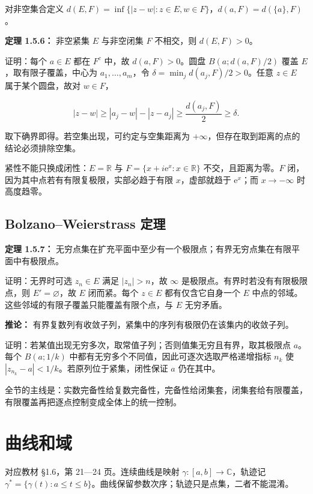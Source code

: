 \documentclass[11pt,a4paper]{article}
\begin{document}
对非空集合定义
\(d(E,F)=\inf\{|z-w|:z\in E,w\in F\}\)，\(d(a,F)=d(\{a\},F)\)。

\textbf{定理 1.5.6：} 非空紧集 \(E\) 与非空闭集 \(F\) 不相交，则
\(d(E,F)>0\)。

证明：每个 \(a\in E\) 都在 \(F^c\) 中，故 \(d(a,F)>0\)。圆盘
\(B(a;d(a,F)/2)\) 覆盖 \(E\)，取有限子覆盖，中心为
\(a_1,\ldots,a_m\)，令 \(\delta=\min_jd(a_j,F)/2>0\)。任意 \(z\in E\)
属于某个圆盘，故对 \(w\in F\)，

\[
|z-w|\ge |a_j-w|-|z-a_j|\ge\frac{d(a_j,F)}2\ge\delta.
\]

取下确界即得。若空集出现，可约定与空集距离为
\(+\infty\)，但存在取到距离的点的结论必须排除空集。

紧性不能只换成闭性：\(E=\mathbb R\) 与
\(F=\{x+i\mathrm e^x:x\in\mathbb R\}\) 不交，且距离为零。\(F\)
闭，因为其中点若有有限复极限，实部必趋于有限 \(x\)，虚部就趋于
\(\mathrm e^x\)；而 \(x\to-\infty\) 时高度趋零。

\subsection{Bolzano--Weierstrass
定理}\label{bolzanoweierstrass-ux5b9aux7406}

\textbf{定理 1.5.7：}
无穷点集在扩充平面中至少有一个极限点；有界无穷点集在有限平面中有极限点。

证明：无界时可选 \(z_n\in E\) 满足 \(|z_n|>n\)，故 \(\infty\)
是极限点。有界时若没有有限极限点，则 \(E'=\varnothing\)，故 \(E\)
闭而紧。每个 \(z\in E\) 都有仅含它自身一个 \(E\)
中点的邻域。这些邻域的有限子覆盖只能覆盖有限个点，与 \(E\) 无穷矛盾。

\textbf{推论：}
有界复数列有收敛子列，紧集中的序列有极限仍在该集内的收敛子列。

证明：若某值出现无穷多次，取常值子列；否则值集无穷且有界，取其极限点
\(a\)。每个 \(B(a;1/k)\)
中都有无穷多个不同值，因此可逐次选取严格递增指标 \(n_k\) 使
\(|z_{n_k}-a|<1/k\)。若原列位于紧集，闭性保证 \(a\) 仍在其中。

全节的主线是：实数完备性给复数完备性，完备性给闭集套，闭集套给有限覆盖，有限覆盖再把逐点控制变成全体上的统一控制。

\section{曲线和域}
对应教材 §1.6，第 21---24 页。连续曲线是映射
\(\gamma:[a,b]\to\mathbb C\)，轨迹记
\(\gamma^*=\{\gamma(t):a\le t\le b\}\)。曲线保留参数次序；轨迹只是点集，二者不能混淆。
\end{document}
